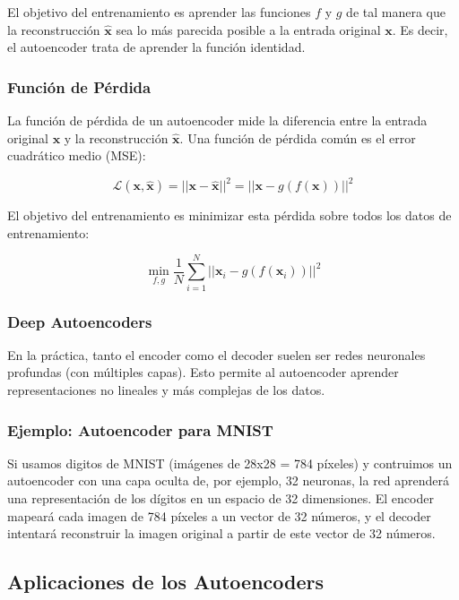 \documentclass{article}
\begin{document}
El objetivo del entrenamiento es aprender las funciones \(f\) y \(g\) de tal manera que la reconstrucción \(\hat{\mathbf{x}}\) sea lo más parecida posible a la entrada original \(\mathbf{x}\). Es decir, el autoencoder trata de aprender la función identidad.

\subsubsection{Función de Pérdida}

La función de pérdida de un autoencoder mide la diferencia entre la entrada original \(\mathbf{x}\) y la reconstrucción \(\hat{\mathbf{x}}\).  Una función de pérdida común es el error cuadrático medio (MSE):

\[
\mathcal{L}(\mathbf{x}, \hat{\mathbf{x}}) = ||\mathbf{x} - \hat{\mathbf{x}}||^2 = ||\mathbf{x} - g(f(\mathbf{x}))||^2
\]

El objetivo del entrenamiento es minimizar esta pérdida sobre todos los datos de entrenamiento:

\[
\min_{f, g} \frac{1}{N} \sum_{i=1}^{N} ||\mathbf{x}_i - g(f(\mathbf{x}_i))||^2
\]

\subsubsection{Deep Autoencoders}

En la práctica, tanto el encoder como el decoder suelen ser redes neuronales profundas (con múltiples capas).  Esto permite al autoencoder aprender representaciones no lineales y más complejas de los datos.

\subsubsection{Ejemplo: Autoencoder para MNIST}
Si usamos digitos de MNIST (imágenes de 28x28 = 784 píxeles) y contruimos un autoencoder con una capa oculta de, por ejemplo, 32 neuronas, la red aprenderá una representación de los dígitos en un espacio de 32 dimensiones. El encoder mapeará cada imagen de 784 píxeles a un vector de 32 números, y el decoder intentará reconstruir la imagen original a partir de este vector de 32 números.

\subsection{Aplicaciones de los Autoencoders}
\end{document}

